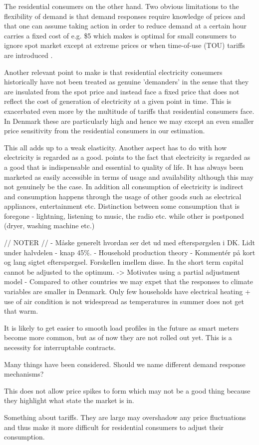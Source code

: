 The residential consumers on the other hand. 
Two obvious limitations to the flexibility of demand is that demand responses require knowledge of prices and that one can assume taking action in order to reduce demand at a certain hour carries a fixed cost of e.g. \$5 which makes is optimal for small consumers to ignore spot market except at extreme prices or when time-of-use (TOU) tariffs are introduced \citep{wolak2011residential}. 

Another relevant point to make is that residential electricity consumers historically have not been treated as genuine 'demanders' in the sense that they are insulated from the spot price and instead face a fixed price that does not reflect the cost of generation of electricity at a given point in time. This is exacerbated even more by the multitude of tariffs that residential consumers face.  
In Denmark these are particularly high and hence we may except an even smaller price sensitivity from the residential consumers in our estimation.   

This all adds up to a weak elasticity. Another aspect has to do with how electricity is regarded as a good. \citep{kirschen2003demand} points to the fact that electricity is regarded as a good that is indispensable and essential to quality of life. It has always been marketed as easily accessible in terms of usage and availability although this may not genuinely be the case. In addition all consumption of electricity is indirect and consumption happens through the usage of other goods such as electrical appliances, entertainment etc. Distinction between some consumption that is foregone - lightning, listening to music, the radio etc. while other is postponed (dryer, washing machine etc.) 


// NOTER // 
- Måske generelt hvordan ser det ud med efterspørgslen i DK. Lidt under halvdelen - knap 45\%. 
- Household production theory 
- Kommentér på kort og lang sigtet efterspørgsel. Forskellen imellem disse. In the short term capital cannot be adjusted to the optimum. -> Motivates using a partial adjustment model  
- Compared to other countries we may expet that the responses to climate variables are smaller in Denmark. Only few households have electrical heating + use of air condition is not widespread as temperatures in summer does not get that warm. 

It is likely to get easier to smooth load profiles in the future as smart meters become more common, but as of now they are not rolled out yet. This is a necessity for interruptable contracts. 


Many things have been considered. Should we name different demand response mechanisms? 

This does not allow price spikes to form which may not be a good thing because they highlight what state the market is in. 

Something about tariffs. They are large may overshadow any price fluctuations and thus make it more difficult for residential consumers to adjust their consumption. 

\citep{kirschen2003demand}
 




